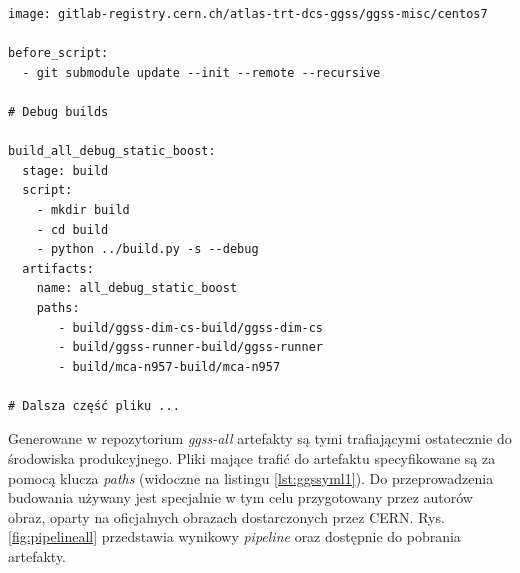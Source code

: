 \begin{lstlisting}[caption={Fragment pliku \textit{.gitlab-ci.yml} konfigurującego \textit{pipeline} CI/CD dla repozytorium \textit{ggss-all}}, label={lst:ggssyml1}]
image: gitlab-registry.cern.ch/atlas-trt-dcs-ggss/ggss-misc/centos7

before_script:
  - git submodule update --init --remote --recursive

# Debug builds 

build_all_debug_static_boost:
  stage: build
  script:
    - mkdir build
    - cd build
    - python ../build.py -s --debug
  artifacts:
    name: all_debug_static_boost
    paths:
       - build/ggss-dim-cs-build/ggss-dim-cs
       - build/ggss-runner-build/ggss-runner
       - build/mca-n957-build/mca-n957

# Dalsza część pliku ...

\end{lstlisting}

Generowane w repozytorium \textit{ggss-all} artefakty są tymi trafiającymi ostatecznie do środowiska produkcyjnego. Pliki mające trafić do artefaktu specyfikowane są za pomocą klucza \textit{paths} (widoczne na listingu \ref{lst:ggssyml1}). Do przeprowadzenia budowania używany jest specjalnie w tym celu przygotowany przez autorów obraz, oparty na oficjalnych obrazach dostarczonych przez CERN. Rys. \ref{fig:pipelineall} przedstawia wynikowy \textit{pipeline} oraz dostępnie do pobrania artefakty.

